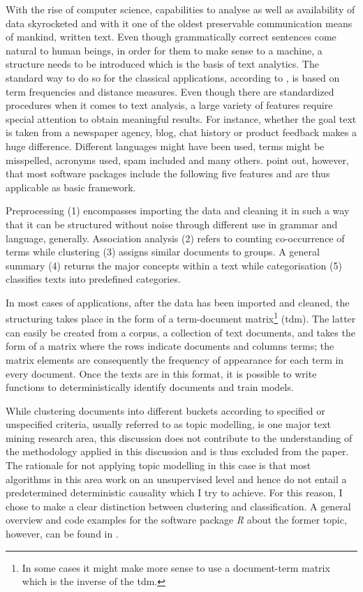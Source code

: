 With the rise of computer science, capabilities to analyse as well as availability of data skyrocketed and with it one of the oldest preservable communication means of mankind, written text. Even though grammatically correct sentences come natural to human beings, in order for them to make sense to a machine, a structure needs to be introduced which is the basis of text analytics. The standard way to do so for the classical applications, according to \textcite{Meyer.2008}, is based on term frequencies and distance measures. Even though there are standardized procedures when it comes to text analysis, a large variety of features require special attention to obtain meaningful results. For instance, whether the goal text is taken from a newspaper agency, blog, chat history or product feedback makes a huge difference. Different languages might have been used, terms might be misspelled, acronyms used, spam included and many others. \textcite{Meyer.2008} point out, however, that most software packages include the following five features and are thus applicable as basic framework. 

Preprocessing (1) encompasses importing the data and cleaning it in such a way that it can be structured without noise through different use in grammar and language, generally. Association analysis (2) refers to counting co-occurrence of terms while clustering (3) assigns similar documents to groups. A general summary (4) returns the major concepts within a text while categorisation (5) classifies texts into predefined categories. 

In most cases of applications, after the data has been imported and cleaned, the structuring takes place in the form of a term-document matrix\footnote{In some cases it might make more sense to use a document-term matrix which is the inverse of the tdm.} (tdm). The latter can easily be created from a corpus, a collection of text documents, and takes the form of a matrix where the rows indicate documents and columns terms; the matrix elements are consequently the frequency of appearance for each term in every document. Once the texts are in this format, it is possible to write functions to deterministically identify documents and train models.

While clustering documents into different buckets according to specified or unspecified criteria, usually referred to as topic modelling, is one major text mining research area, this discussion does not contribute to the understanding of the methodology applied in this discussion and is thus excluded from the paper. The rationale for not applying topic modelling in this case is that most algorithms in this area work on an unsupervised level and hence do not entail a predetermined deterministic causality which I try to achieve. For this reason, I chose to make a clear distinction between clustering and classification. A general overview and code examples for the software package \textit{R} about the former topic, however, can be found in \textcite[ch.~6]{Silge.2017}.

